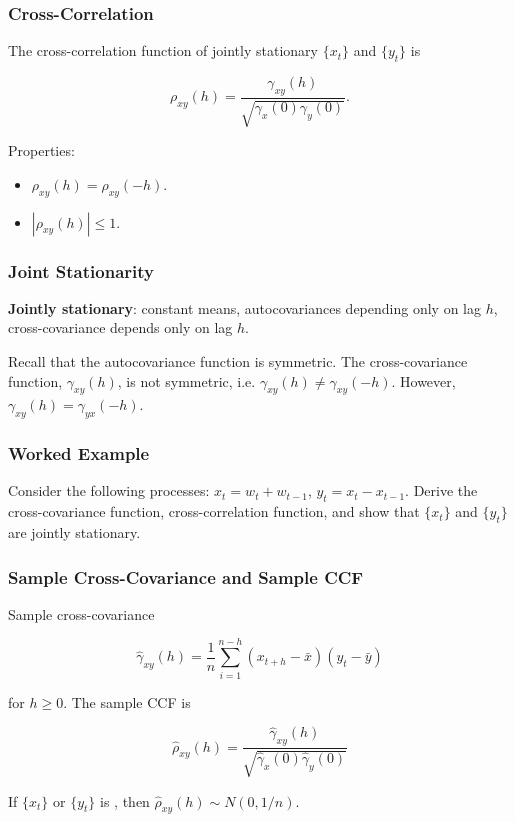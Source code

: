 \documentclass[%
xcolor=pdftex]{beamer}
\begin{document}
\begin{frame}
\frametitle{Cross-Correlation}

The cross-correlation function of jointly stationary $\{x_t\}$ and $\{y_t\}$ is

\begin{equation} \label{eq:cor}
\rho_{xy}(h) = \frac{\gamma_{xy}(h)}{\sqrt{\gamma_x(0) \gamma_y(0)}}.
\end{equation}

Properties:
\begin{itemize}
\item $\rho_{xy}(h) = \rho_{xy}(-h)$.
\item $|\rho_{xy}(h)| \leq 1$.
\end{itemize}

\end{frame}

\begin{frame}
\frametitle{Joint Stationarity}

\textbf{Jointly stationary}: constant means, autocovariances depending only on lag $h$, cross-covariance depends only on lag $h$.\\

\vspace{5mm}

Recall that the autocovariance function is symmetric. The cross-covariance function, $\gamma_{xy}(h)$, is not symmetric, i.e. $\gamma_{xy}(h) \neq \gamma_{xy}(-h)$. However, $\gamma_{xy}(h) = \gamma_{yx}(-h)$.

\end{frame}

\begin{frame}
\frametitle{Worked Example}

Consider the following processes: $x_t = w_t + w_{t-1}$, $y_t = x_t - x_{t-1}$. Derive the cross-covariance function, cross-correlation function, and show that $\{x_t\}$ and $\{y_t\}$ are jointly stationary.\\

\vspace{50mm}

\end{frame}

\begin{frame}
\frametitle{Sample Cross-Covariance and Sample CCF}

Sample cross-covariance

\begin{equation*}
\hat{\gamma}_{xy}(h) = \frac{1}{n} \sum_{i=1}^{n-h} (x_{t+h} - \bar{x}) (y_{t} - \bar{y})
\end{equation*}

for $h \geq 0$. The sample CCF is

\begin{equation*}
\hat{\rho}_{xy}(h) = \frac{\hat{\gamma}_{xy}(h)}{\sqrt{\hat{\gamma}_{x}(0) \hat{\gamma}_{y}(0) }}
\end{equation*}

If $\{x_t\}$ or $\{y_t\}$ is \underline{\hspace{20 mm}}, then $\hat{\rho}_{xy}(h) \sim N(0, 1/n)$.

\end{frame}
\end{document}

